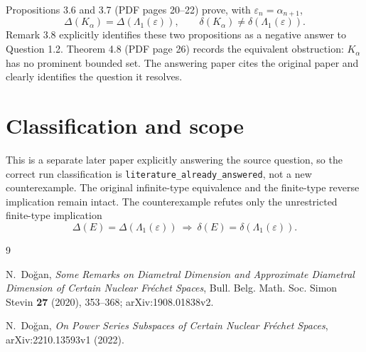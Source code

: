 \documentclass[10pt]{article}
\begin{document}
Propositions 3.6 and 3.7 (PDF pages 20--22) prove, with
$\varepsilon_n=\alpha_{n+1}$,
\[
 \Delta(K_\alpha)=\Delta(\Lambda_1(\varepsilon)),
 \qquad
 \delta(K_\alpha)\ne\delta(\Lambda_1(\varepsilon)).
\]
Remark 3.8 explicitly identifies these two propositions as a negative answer
to Question 1.2. Theorem 4.8 (PDF page 26) records the equivalent obstruction:
$K_\alpha$ has no prominent bounded set. The answering paper cites the
original paper and clearly identifies the question it resolves.

\section{Classification and scope}

This is a separate later paper explicitly answering the source question, so
the correct run classification is \texttt{literature\_already\_answered}, not
a new counterexample. The original infinite-type equivalence and the
finite-type reverse implication remain intact. The counterexample refutes
only the unrestricted finite-type implication
\[
 \Delta(E)=\Delta(\Lambda_1(\varepsilon))
 \ \Longrightarrow\ 
 \delta(E)=\delta(\Lambda_1(\varepsilon)).
\]

\begin{thebibliography}{9}
\raggedright
{}
N.~Do\u{g}an,
\emph{Some Remarks on Diametral Dimension and Approximate Diametral
Dimension of Certain Nuclear Fr\'echet Spaces},
Bull. Belg. Math. Soc. Simon Stevin \textbf{27} (2020), 353--368;
arXiv:1908.01838v2.

N.~Do\u{g}an,
\emph{On Power Series Subspaces of Certain Nuclear Fr\'echet Spaces},
arXiv:2210.13593v1 (2022).
\end{thebibliography}
\end{document}
